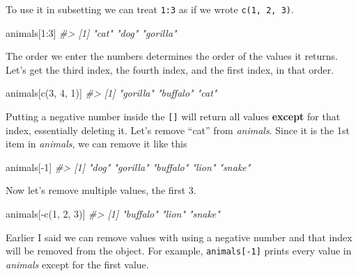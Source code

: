 \documentclass[
]{krantz}
\makeatletter
\newenvironment{Shaded}{\begin{snugshade}}{\end{snugshade}}
\newcommand{\CommentTok}[1]{\textcolor[rgb]{0.37,0.37,0.37}{\textit{#1}}}
\newcommand{\DecValTok}[1]{\textcolor[rgb]{0.06,0.06,0.06}{#1}}
\newcommand{\FunctionTok}[1]{\textcolor[rgb]{0,0,0}{#1}}
\newcommand{\NormalTok}[1]{#1}
\newcommand{\SpecialCharTok}[1]{\textcolor[rgb]{0,0,0}{#1}}
\newenvironment{kframe}{%
\medskip{}
\setlength{\fboxsep}{.8em}
 \def\at@end@of@kframe{}%
 \ifinner\ifhmode%
  \def\at@end@of@kframe{\end{minipage}}%
  \begin{minipage}{\columnwidth}%
 \fi\fi%
 \def\FrameCommand##1{\hskip\@totalleftmargin \hskip-\fboxsep
 \colorbox{shadecolor}{##1}\hskip-\fboxsep
     \hskip-\linewidth \hskip-\@totalleftmargin \hskip\columnwidth}%
 \MakeFramed {\advance\hsize-\width
   \@totalleftmargin\z@ \linewidth\hsize
   \@setminipage}}%
 {\par\unskip\endMakeFramed%
 \at@end@of@kframe}
\renewenvironment{Shaded}{\begin{kframe}}{\end{kframe}}
\makeatother
\begin{document}
To use it in subsetting we can treat \texttt{1:3} as if we wrote \texttt{c(1,\ 2,\ 3)}.

\begin{Shaded}
\begin{Highlighting}[]
\NormalTok{animals[}\DecValTok{1}\SpecialCharTok{:}\DecValTok{3}\NormalTok{]}
\CommentTok{\#\textgreater{} [1] "cat"     "dog"     "gorilla"}
\end{Highlighting}
\end{Shaded}

The order we enter the numbers determines the order of the values it returns. Let's get the third index, the fourth index, and the first index, in that order.

\begin{Shaded}
\begin{Highlighting}[]
\NormalTok{animals[}\FunctionTok{c}\NormalTok{(}\DecValTok{3}\NormalTok{, }\DecValTok{4}\NormalTok{, }\DecValTok{1}\NormalTok{)]}
\CommentTok{\#\textgreater{} [1] "gorilla" "buffalo" "cat"}
\end{Highlighting}
\end{Shaded}

Putting a negative number inside the \texttt{{[}{]}} will return all values \textbf{except} for that index, essentially deleting it. Let's remove ``cat'' from \emph{animals}. Since it is the 1st item in \emph{animals}, we can remove it like this

\begin{Shaded}
\begin{Highlighting}[]
\NormalTok{animals[}\SpecialCharTok{{-}}\DecValTok{1}\NormalTok{]}
\CommentTok{\#\textgreater{} [1] "dog"     "gorilla" "buffalo" "lion"    "snake"}
\end{Highlighting}
\end{Shaded}

Now let's remove multiple values, the first 3.

\begin{Shaded}
\begin{Highlighting}[]
\NormalTok{animals[}\SpecialCharTok{{-}}\FunctionTok{c}\NormalTok{(}\DecValTok{1}\NormalTok{, }\DecValTok{2}\NormalTok{, }\DecValTok{3}\NormalTok{)]}
\CommentTok{\#\textgreater{} [1] "buffalo" "lion"    "snake"}
\end{Highlighting}
\end{Shaded}

Earlier I said we can remove values with using a negative number and that index will be removed from the object. For example, \texttt{animals{[}-1{]}} prints every value in \emph{animals} except for the first value.
\end{document}
